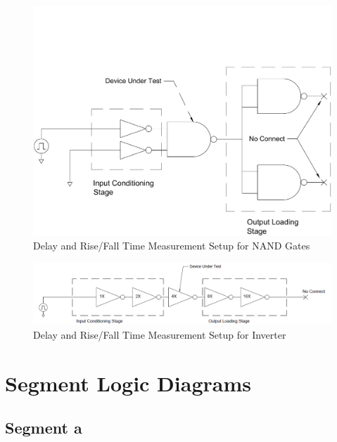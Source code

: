 \documentclass[12pt]{article}
\begin{document}
\begin{figure}[H]
	\centering
	\includegraphics[width=\textwidth, keepaspectratio]{Graphics/NAND_FO4}
	\caption{Delay and Rise/Fall Time Measurement Setup for NAND Gates}
	\label{fig:nand_delay_meas}
\end{figure}

\begin{figure}[H]
	\centering
	\includegraphics[width=\textwidth, keepaspectratio]{Graphics/INV_FO4}
	\caption{Delay and Rise/Fall Time Measurement Setup for Inverter}
	\label{fig:inv_delay_meas}
\end{figure}

\newpage
\appendix
\section{Segment Logic Diagrams}
\label{app:segmentLogic}
\subsection{Segment a}
\end{document}
